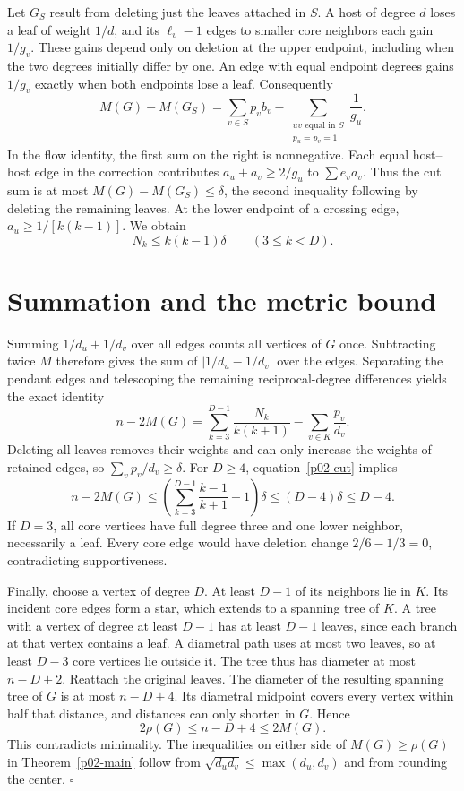 \documentclass[11pt,a4paper]{article}
\begin{document}
Let $G_S$ result from deleting just the leaves attached in $S$.
A host of degree $d$ loses a leaf of weight $1/d$, and its
$\ell_v-1$ edges to smaller core neighbors each gain $1/g_v$.
These gains depend only on deletion at the upper endpoint, including
when the two degrees initially differ by one. An edge with equal
endpoint degrees gains $1/g_v$ exactly when both endpoints lose a leaf.
Consequently
\[
 M(G)-M(G_S)=\sum_{v\in S}p_v b_v-
 \sum_{\substack{uv\text{ equal in }S\\p_u=p_v=1}}\frac1{g_u}.
\]
In the flow identity, the first sum on the right is nonnegative. Each
equal host--host edge in the correction contributes $a_u+a_v\ge2/g_u$
to $\sum e_v a_v$. Thus the cut sum is at most $M(G)-M(G_S)\le\delta$,
the second inequality following by deleting the remaining leaves.
At the lower endpoint of a crossing edge, $a_u\ge1/[k(k-1)]$. We obtain
\begin{equation}\label{p02-cut}
 \boxed{N_k\le k(k-1)\delta\qquad(3\le k<D).}
\end{equation}

\section{Summation and the metric bound}
Summing $1/d_u+1/d_v$ over all edges counts all vertices of $G$ once.
Subtracting twice $M$ therefore gives the sum of $|1/d_u-1/d_v|$ over
the edges. Separating the pendant edges and telescoping the remaining
reciprocal-degree differences yields the exact identity
\[
 n-2M(G)=\sum_{k=3}^{D-1}\frac{N_k}{k(k+1)}
               -\sum_{v\in K}\frac{p_v}{d_v}.
\]
Deleting all leaves removes their weights and can only increase the
weights of retained edges, so $\sum_v p_v/d_v\ge\delta$.
For $D\ge4$, equation~\eqref{p02-cut} implies
\[
 n-2M(G)\le
 \left(\sum_{k=3}^{D-1}\frac{k-1}{k+1}-1\right)\delta
 \le (D-4)\delta\le D-4 .
\]
If $D=3$, all core vertices have full degree three and one lower
neighbor, necessarily a leaf. Every core edge would have deletion
change $2/6-1/3=0$, contradicting supportiveness.

Finally, choose a vertex of degree $D$. At least $D-1$ of its
neighbors lie in $K$. Its incident core edges form a star, which
extends to a spanning tree of $K$. A tree with a vertex of degree
at least $D-1$ has at least $D-1$ leaves, since each branch at that
vertex contains a leaf. A diametral path uses at most two leaves, so
at least $D-3$ core vertices lie outside it. The tree thus has diameter
at most $n-D+2$. Reattach the original leaves. The diameter of the
resulting spanning tree of $G$ is at most $n-D+4$. Its diametral
midpoint covers every vertex within half that distance, and distances
can only shorten in $G$. Hence
\[
 2\rho(G)\le n-D+4\le2M(G).
\]
This contradicts minimality. The inequalities on either side of
$M(G)\ge\rho(G)$ in Theorem~\ref{p02-main} follow from
$\sqrt{d_ud_v}\le\max(d_u,d_v)$ and from rounding the center.
\hfill$\square$
\end{document}
